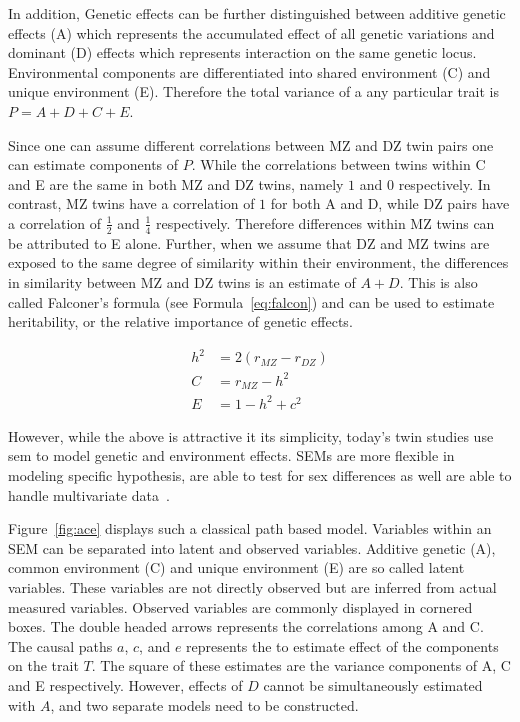 In addition, Genetic effects can be further distinguished between additive genetic effects (A) which represents the accumulated effect of all genetic variations and dominant (D) effects which represents interaction on the same genetic locus.
Environmental components are differentiated into shared environment (C) and unique environment (E).
Therefore the total variance of a any particular trait is $P = A+D+C+E$.

Since one can assume different correlations between MZ and DZ twin pairs one can estimate components of $P$.
While the correlations between twins within C and E are the same in both MZ and DZ twins, namely $1$ and $0$ respectively.
In contrast, MZ twins have a correlation of $1$ for both A and D, while DZ pairs have a correlation of $\frac{1}{2}$ and $\frac{1}{4}$ respectively.
Therefore differences within MZ twins can be attributed to E alone.
Further, when we assume that DZ and MZ twins are exposed to the same degree of similarity within their environment, the differences in similarity between MZ and DZ twins is an estimate of $A+D$.
This is also called Falconer's formula (see Formula~\ref{eq:falcon}) and can be used to estimate heritability, or the relative importance of genetic effects.

\begin{align}
  h^2 &= 2(r_{MZ}-r_{DZ})\label{eq:falcon} \\ 
  C &= r_{MZ} - h^2  \\
  E &= 1 - h^2 + c^2  
\end{align}

However, while the above is attractive it its simplicity, today's twin studies use \acrfull{sem} to model genetic and environment effects.
SEMs are more flexible in modeling specific hypothesis, are able to test for sex differences as well are able to handle multivariate data~\cite{Rijsdijk2002}.

Figure~\ref{fig:ace} displays such a classical path based model.
Variables within an SEM can be separated into latent and observed variables.
Additive genetic (A), common environment (C) and unique environment (E) are so called latent variables.
These variables are not directly observed but are inferred from actual measured variables.
Observed variables are commonly displayed in cornered boxes.
The double headed arrows represents the correlations among A and C.
The causal paths $a$, $c$, and $e$ represents the to estimate effect of the components on the trait $T$.
The square of these estimates are the variance components of A, C and E respectively.
However, effects of $D$ cannot be simultaneously estimated with $A$, and two separate models need to be constructed.

